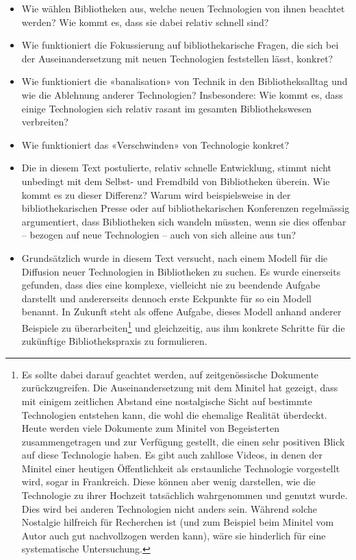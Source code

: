 \documentclass[a4paper,
fontsize=11pt,
oneside,
numbers=noperiodatend,
parskip=half-,
bibliography=totoc,
final
]{scrartcl}
\begin{document}
\begin{itemize}
\item
  Wie wählen Bibliotheken aus, welche neuen Technologien von ihnen
  beachtet werden? Wie kommt es, dass sie dabei relativ schnell sind?
\item
  Wie funktioniert die Fokussierung auf bibliothekarische Fragen, die
  sich bei der Auseinandersetzung mit neuen Technologien feststellen
  lässt, konkret?
\item
  Wie funktioniert die «banalisation» von Technik in den
  Bibliotheksalltag und wie die Ablehnung anderer Technologien?
  Insbesondere: Wie kommt es, dass einige Technologien sich relativ
  rasant im gesamten Bibliothekswesen verbreiten?
\item
  Wie funktioniert das «Verschwinden» von Technologie konkret?
\item
  Die in diesem Text postulierte, relativ schnelle Entwicklung, stimmt
  nicht unbedingt mit dem Selbst- und Fremdbild von Bibliotheken
  überein. Wie kommt es zu dieser Differenz? Warum wird beispielsweise
  in der bibliothekarischen Presse oder auf bibliothekarischen
  Konferenzen regelmässig argumentiert, dass Bibliotheken sich wandeln
  müssten, wenn sie dies offenbar -- bezogen auf neue Technologien --
  auch von sich alleine aus tun?
\item
  Grundsätzlich wurde in diesem Text versucht, nach einem Modell für die
  Diffusion neuer Technologien in Bibliotheken zu suchen. Es wurde
  einerseits gefunden, dass dies eine komplexe, vielleicht nie zu
  beendende Aufgabe darstellt und andererseits dennoch erste Eckpunkte
  für so ein Modell benannt. In Zukunft steht als offene Aufgabe, dieses
  Modell anhand anderer Beispiele zu überarbeiten\footnote{Es sollte
    dabei darauf geachtet werden, auf zeitgenössische Dokumente
    zurückzugreifen. Die Auseinandersetzung mit dem Minitel hat gezeigt,
    dass mit einigem zeitlichen Abstand eine nostalgische Sicht auf
    bestimmte Technologien entstehen kann, die wohl die ehemalige
    Realität überdeckt. Heute werden viele Dokumente zum Minitel von
    Begeisterten zusammengetragen und zur Verfügung gestellt, die einen
    sehr positiven Blick auf diese Technologie haben. Es gibt auch
    zahllose Videos, in denen der Minitel einer heutigen Öffentlichkeit
    als erstaunliche Technologie vorgestellt wird, sogar in Frankreich.
    Diese können aber wenig darstellen, wie die Technologie zu ihrer
    Hochzeit tatsächlich wahrgenommen und genutzt wurde. Dies wird bei
    anderen Technologien nicht anders sein. Während solche Nostalgie
    hilfreich für Recherchen ist (und zum Beispiel beim Minitel vom
    Autor auch gut nachvollzogen werden kann), wäre sie hinderlich für
    eine systematische Untersuchung.} und gleichzeitig, aus ihm konkrete
  Schritte für die zukünftige Bibliothekspraxis zu formulieren.
\end{itemize}
\end{document}
